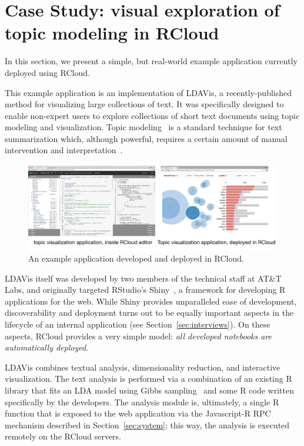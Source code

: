 \section{Case Study\label{sec:casestudy}: visual exploration of topic modeling in RCloud}

In this section, we present a simple, but real-world example
application currently deployed using RCloud.

This example application is an implementation of LDAVis, a
recently-published method for visualizing large collections of
text. It was specifically designed to enable non-expert users to
explore collections of short text documents using topic modeling and
visualization. Topic modeling~\cite{Blei:2003:LDA} is a standard
technique for text summarization which, although powerful, requires a
certain amount of manual intervention and
interpretation~\cite{Sievert:2014:LAM}.

\begin{figure}
  \includegraphics[width=\linewidth]{fig/casestudytext/casestudytext.pdf}
  \caption{\label{fig:textvis}An example application developed and deployed in RCloud.}
\end{figure}

LDAVis itself was developed by two members of the technical staff at
AT\&T Labs, and originally targeted RStudio's
Shiny~\cite{RStudio:2013:SWA}, a framework for developing R
applications for the web.  While Shiny provides unparalleled ease of
development, discoverability and deployment turns out to be equally
important aspects in the lifecycle of an internal application (see
Section~\ref{sec:interviews}).  On these aspects, RCloud provides a
very simple model: \emph{all developed notebooks are automatically
  deployed}.

LDAVis combines textual analysis, dimensionality reduction, and
interactive visualization. The text analysis is performed via a
combination of an existing R library that fits an LDA model using
Gibbs sampling~\cite{} and some R code written specifically by the
developers. The analysis module is, ultimately, a single R function
that is exposed to the web application via the Javascript-R RPC
mechanism described in Section~\ref{sec:system}; this way, the
analysis is executed remotely on the RCloud servers.

